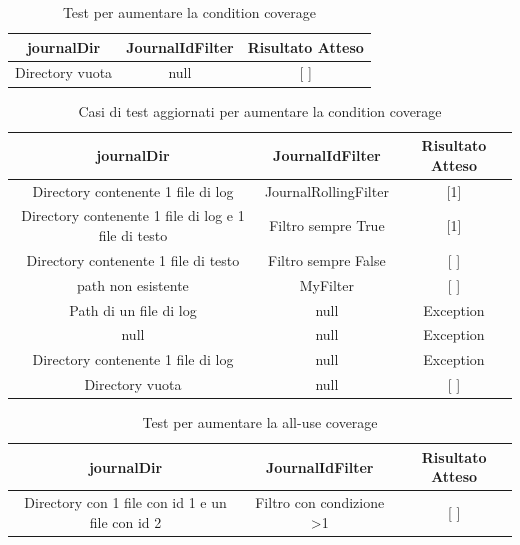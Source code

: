 \documentclass[12pt, a4paper]{article}
\begin{document}
\begin{table}[ht]
  \centering
  \caption[Journal: Test Suite - Adequacy Control Flow 3]{Test per aumentare la condition coverage}
  \begin{tabular}{|c|c|c|}
    \hline
    journalDir & JournalIdFilter & Risultato Atteso \\
    \hline
    {Directory vuota} & null & [ ] \\
    \hline
  \end{tabular}
  \label{tab:ACF3ListJournalIds}
\end{table}

\begin{table}[ht]
  \centering
  \caption[Journal: Test Suite - Adequacy Control Flow 4]{Casi di test aggiornati per aumentare la condition coverage}
  \begin{tabular}{|c|c|c|}
  \hline
  journalDir & JournalIdFilter & Risultato Atteso \\
  \hline
  {Directory contenente 1 file di log} & JournalRollingFilter & [1] \\
  {Directory contenente 1 file di log e 1 file di testo} & Filtro sempre True & [1] \\
  {Directory contenente 1 file di testo} & Filtro sempre False & [ ] \\
  {path non esistente} & MyFilter & [ ] \\
  {Path di un file di log} & null & Exception \\
  null & null & Exception \\
  {Directory contenente 1 file di log} & null & Exception \\
  {Directory vuota} & null & [ ] \\
  \hline
  \end{tabular}
  \label{tab:ACF4ListJournalIds}
\end{table}

  \begin{table}[ht]
    \centering
    \caption[Journal: Test Suite - Adequacy Data Flow 1]{Test per aumentare la all-use coverage}
    \begin{tabular}{|c|c|c|}
      \hline
      journalDir & JournalIdFilter & Risultato Atteso \\
      \hline
      {Directory con 1 file con id 1 e un file con id 2} & {Filtro con condizione >1} & [ ] \\
      \hline
    \end{tabular}
    \label{tab:ADF1ListJournalIds}
  \end{table}
\end{document}
